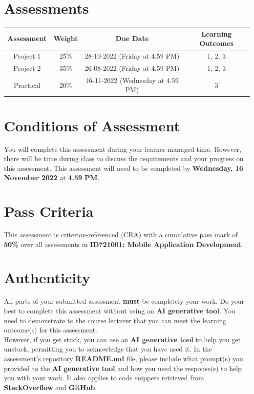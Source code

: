 \documentclass{article}
\begin{document}
\section*{Assessments}
\renewcommand{\arraystretch}{1.5}
\begin{tabular}{|c|c|c|c|}
	\hline
	\textbf{Assessment} & \textbf{Weight} & \textbf{Due Date}    & \textbf{Learning Outcomes} \\ \hline
	Project 1            & 25\%            & 28-10-2022 (Friday at 4.59 PM)  & 1, 2, 3                    \\ \hline
	Project 2         & 35\%            & 26-08-2022 (Friday at 4.59 PM) & 1, 2, 3                    \\ \hline
	Practical       & 20\%            & 16-11-2022 (Wednesday at 4.59 PM) & 3                       \\ \hline
\end{tabular}

\section*{Conditions of Assessment}
You will complete this assessment during your learner-managed time. However, there will be time during class to discuss the requirements and your progress on this assessment. This assessment will need to be completed by \textbf{Wednesday, 16 November 2022} at \textbf{4.59 PM}.

\section*{Pass Criteria}
This assessment is criterion-referenced (CRA) with a cumulative pass mark of \textbf{50\%} over all assessments in \textbf{ID721001: Mobile Application Development}.

\section*{Authenticity}
All parts of your submitted assessment \textbf{must} be completely your work. Do your best to complete this assessment without using an \textbf{AI generative tool}. You need to demonstrate to the course lecturer that you can meet the learning outcome(s) for this assessment. \\
 
 However, if you get stuck, you can use an \textbf{AI generative tool} to help you get unstuck, permitting you to acknowledge that you have used it. In the assessment's repository \textbf{README.md} file, please include what prompt(s) you provided to the \textbf{AI generative tool} and how you used the response(s) to help you with your work. It also applies to code snippets retrieved from \textbf{StackOverflow} and \textbf{GitHub}. \\
 
\end{document}
